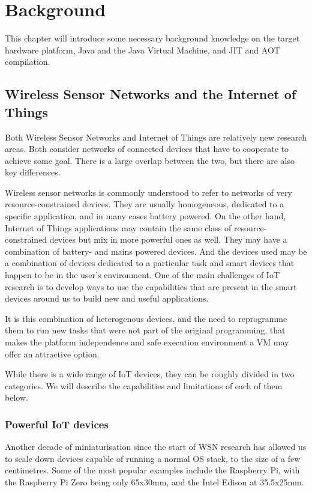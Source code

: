 \chapter{Background}
This chapter will introduce some necessary background knowledge on the target hardware platform, Java and the Java Virtual Machine, and JIT and AOT compilation.

\section{Wireless Sensor Networks and the Internet of Things}
Both Wireless Sensor Networks and Internet of Things are relatively new research areas. Both consider networks of connected devices that have to cooperate to achieve some goal. There is a large overlap between the two, but there are also key differences.

Wireless sensor networks is commonly understood to refer to networks of very resource-constrained devices. They are usually homogeneous, dedicated to a specific application, and in many cases battery powered. On the other hand, Internet of Things applications may contain the same class of resource-constrained devices but mix in more powerful ones as well. They may have a combination of battery- and mains powered devices. And the devices used may be a combination of devices dedicated to a particular task and smart devices that happen to be in the user's environment. One of the main challenges of IoT research is to develop ways to use the capabilities that are present in the smart devices around us to build new and useful applications.

It is this combination of heterogenous devices, and the need to reprogramme them to run new tasks that were not part of the original programming, that makes the platform independence and safe execution environment a VM may offer an attractive option.

While there is a wide range of IoT devices, they can be roughly divided in two categories. We will describe the capabilities and limitations of each of them below. 


\subsection{Powerful IoT devices}
Another decade of miniaturisation since the start of WSN research has allowed us to scale down devices capable of running a normal OS stack, to the size of a few centimetres. Some of the most popular examples include the Raspberry Pi, with the Raspberry Pi Zero being only 65x30mm, and the Intel Edison at 35.5x25mm.

